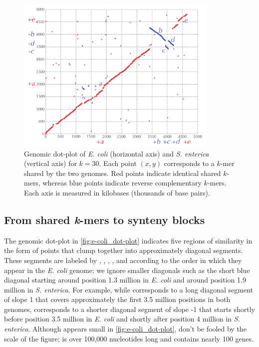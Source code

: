 \begin{figure}[h]
\mySfFamily
\centering
\includegraphics[width = 0.856\textwidth]{images/rearrangements/e-coli_dot-plot}
\caption{Genomic dot-plot of \textit{E. coli} (horizontal axis) and \textit{S. enterica} (vertical axis) for $k = 30$. Each point $(x, y)$ corresponds to a $k$-mer shared by the two genomes.  Red points indicate identical shared $k$-mers, whereas blue points indicate reverse complementary $k$-mers.  Each axis is measured in kilobases (thousands of base pairs).}
\label{fig:e-coli_dot-plot}
\end{figure}

\begin{qbox}\end{qbox}

\subsection{From shared \emph{k}-mers to synteny blocks}
\label{subsec:from_shared_k-mers_to_synteny_blocks}

The genomic dot-plot in \autoref{fig:e-coli_dot-plot} indicates five regions of similarity in the form of points that clump together into approximately diagonal segments.  These segments are labeled by , , , , and  according to the order in which they appear in the \textit{E. coli} genome; we ignore smaller diagonals such as the short blue diagonal starting around position 1.3 million in \textit{E. coli} and around position 1.9 million in \textit{S. enterica}. For example, while  corresponds to a long diagonal segment of slope 1 that covers approximately the first 3.5 million positions in both genomes,  corresponds to a shorter diagonal segment of slope -1 that starts shortly before position 3.5 million in \textit{E. coli} and shortly after position 4 million in \textit{S. enterica}. Although  appears small in \autoref{fig:e-coli_dot-plot}, don't be fooled by the scale of the figure;  is over 100,000 nucleotides long and contains nearly 100 genes.

